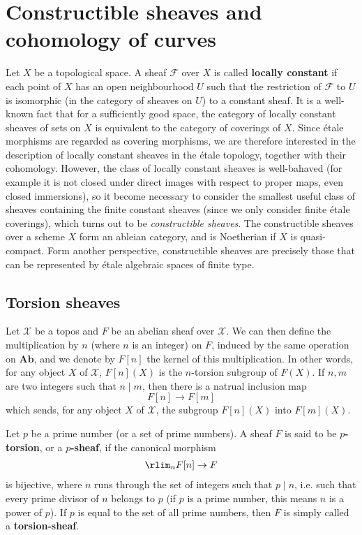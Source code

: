 \section{Constructible sheaves and cohomology of curves}
Let $X$ be a topological space. A sheaf $\mathscr{F}$ over $X$ is called \textbf{locally constant} if each point of $X$ has an open neighbourhood $U$ such that the restriction of $\mathscr{F}$ to $U$ is isomorphic (in the category of sheaves on $U$) to a constant sheaf. It is a well-known fact that for a sufficiently good space, the category of locally constant sheaves of sets on $X$ is equivalent to the category of coverings of $X$. Since \'etale morphisms are regarded as covering morphisms, we are therefore interested in the description of locally constant sheaves in the \'etale topology, together with their cohomology. However, the class of locally constant sheaves is well-bahaved (for example it is not closed under direct images with respect to proper maps, even closed immersions), so it become necessary to consider the smallest useful class of sheaves containing the finite constant sheaves (since we only consider finite \'etale coverings), which turns out to be \textit{constructible sheaves}. The constructible sheaves over a scheme $X$ form an ableian category, and is Noetherian if $X$ is quasi-compact. Form another perspective, constructible sheaves are precisely those that can be represented by \'etale algebraic spaces of finite type.
\subsection{Torsion sheaves}
Let $\mathcal{X}$ be a topos and $F$ be an abelian sheaf over $\mathcal{X}$. We can then define the multiplication by $n$ (where $n$ is an integer) on $F$, induced by the same operation on $\mathbf{Ab}$, and we denote by $F[n]$ the kernel of this multiplication. In other words, for any object $X$ of $\mathcal{X}$, $F[n](X)$ is the $n$-torsion subgroup of $F(X)$. If $n,m$ are two integers such that $n\mid m$, then there is a natrual inclusion map
\[F[n]\to F[m]\]
which sends, for any object $X$ of $\mathcal{X}$, the subgroup $F[n](X)$ into $F[m](X)$.

\begin{definition}
Let $p$ be a prime number (or a set of prime numbers). A sheaf $F$ is said to be \textbf{$p$-torsion}, or a \textbf{$p$-sheaf}, if the canonical morphism
\begin{align}\label{topos torsion abelian sheaf def}
\rlim_nF[n]\to F
\end{align}
is bijective, where $n$ runs through the set of integers such that $p\mid n$, i.e. such that every prime divisor of $n$ belongs to $p$ (if $p$ is a prime number, this means $n$ is a power of $p$). If $p$ is equal to the set of all prime numbers, then $F$ is simply called a \textbf{torsion-sheaf}.
\end{definition}

